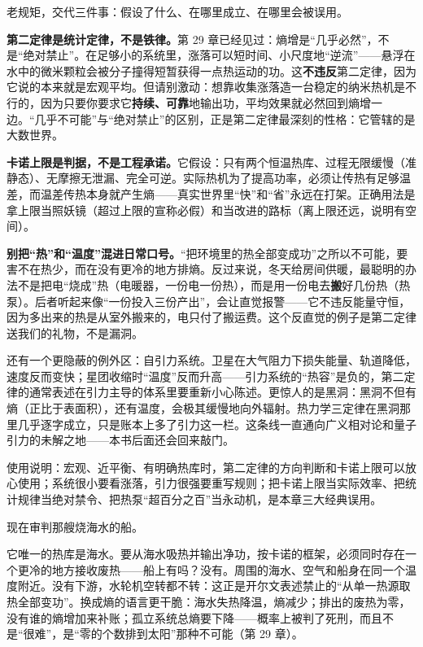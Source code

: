
老规矩，交代三件事：假设了什么、在哪里成立、在哪里会被误用。

\textbf{第二定律是统计定律，不是铁律。}第 29 章已经见过：熵增是“几乎必然”，不是“绝对禁止”。在足够小的系统里，涨落可以短时间、小尺度地“逆流”——悬浮在水中的微米颗粒会被分子撞得短暂获得一点热运动的功。这\textbf{不违反}第二定律，因为它说的本来就是宏观平均。但请别激动：想靠收集涨落造一台稳定的纳米热机是不行的，因为只要你要求它\textbf{持续、可靠}地输出功，平均效果就必然回到熵增一边。“几乎不可能”与“绝对禁止”的区别，正是第二定律最深刻的性格：它管辖的是大数世界。

\textbf{卡诺上限是判据，不是工程承诺。}它假设：只有两个恒温热库、过程无限缓慢（准静态）、无摩擦无泄漏、完全可逆。实际热机为了提高功率，必须让传热有足够温差，而温差传热本身就产生熵——真实世界里“快”和“省”永远在打架。正确用法是拿上限当照妖镜（超过上限的宣称必假）和当改进的路标（离上限还远，说明有空间）。

\textbf{别把“热”和“温度”混进日常口号。}“把环境里的热全部变成功”之所以不可能，要害不在热少，而在没有更冷的地方排熵。反过来说，冬天给房间供暖，最聪明的办法不是把电“烧成”热（电暖器，一份电一份热），而是用一份电去\textbf{搬}好几份热（热泵）。后者听起来像“一份投入三份产出”，会让直觉报警——它不违反能量守恒，因为多出来的热是从室外搬来的，电只付了搬运费。这个反直觉的例子是第二定律送我们的礼物，不是漏洞。

\begin{challenge}
还有一个更隐蔽的例外区：自引力系统。卫星在大气阻力下损失能量、轨道降低，速度反而变快；星团收缩时“温度”反而升高——引力系统的“热容”是负的，第二定律的通常表述在引力主导的体系里要重新小心陈述。更惊人的是黑洞：黑洞不但有熵（正比于表面积），还有温度，会极其缓慢地向外辐射。热力学三定律在黑洞那里几乎逐字成立，只是账本上多了引力这一栏。这条线一直通向广义相对论和量子引力的未解之地——本书后面还会回来敲门。
\end{challenge}

\begin{mainline}
使用说明：宏观、近平衡、有明确热库时，第二定律的方向判断和卡诺上限可以放心使用；系统很小要看涨落，引力很强要重写规则；把卡诺上限当实际效率、把统计规律当绝对禁令、把热泵“超百分之百”当永动机，是本章三大经典误用。
\end{mainline}


现在审判那艘烧海水的船。

它唯一的热库是海水。要从海水吸热并输出净功，按卡诺的框架，必须同时存在一个更冷的地方接收废热——船上有吗？没有。周围的海水、空气和船身在同一个温度附近。没有下游，水轮机空转都不转：这正是开尔文表述禁止的“从单一热源取热全部变功”。换成熵的语言更干脆：海水失热降温，熵减少；排出的废热为零，没有谁的熵增加来补账；孤立系统总熵要下降——概率上被判了死刑，而且不是“很难”，是“零的个数排到太阳”那种不可能（第 29 章）。

